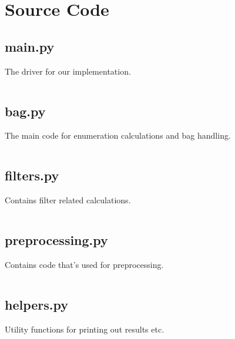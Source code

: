 \chapter{Source Code}
\label{appendix:source}

\section{main.py}
The driver for our implementation.
\inputminted[fontsize=\scriptsize,breaklines]{python}{../src/enumerator/main.py}

\section{bag.py}
The main code for enumeration calculations and bag handling.
\inputminted[fontsize=\scriptsize,breaklines]{python}{../src/enumerator/bag.py}

\section{filters.py}
Contains filter related calculations.
\inputminted[fontsize=\scriptsize,breaklines]{python}{../src/enumerator/filters.py}

\section{preprocessing.py}
Contains code that's used for preprocessing.
\inputminted[fontsize=\scriptsize,breaklines]{python}{../src/enumerator/preprocessing.py}

\section{helpers.py}
Utility functions for printing out results etc.
\inputminted[fontsize=\scriptsize,breaklines]{python}{../src/enumerator/helpers.py}
